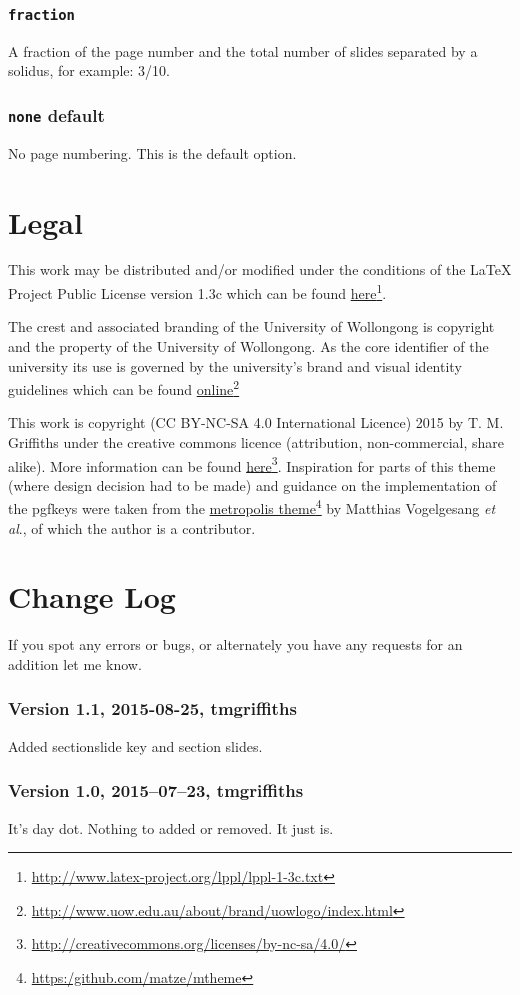 \documentclass[a4paper,oneside,11pt]{article}
\newcommand{\val}[1]{\texttt{\color{UOWblue}#1}}
\begin{document}
\subsubsection*{\val{fraction}}
A fraction of the page number and the total number of slides separated by a solidus, for example: 3/10.

\subsubsection*{\val{none} default}
No page numbering. This is the default option.


\section{Legal}
This work may be distributed and/or modified under the conditions of the LaTeX Project Public License version 1.3c which can be found \href{http://www.latex-project.org/lppl/lppl-1-3c.txt}{here}\footnote{\url{http://www.latex-project.org/lppl/lppl-1-3c.txt}}.

The crest and associated branding of the University of Wollongong is copyright and the property of the University of Wollongong. As the core identifier of the university its use is governed by the university's brand and visual identity guidelines which can be found \href{http://www.uow.edu.au/about/brand/uowlogo/index.html}{online}\footnote{\url{http://www.uow.edu.au/about/brand/uowlogo/index.html}}

This work is copyright (CC BY-NC-SA 4.0 International Licence) 2015 by T. M. Griffiths under the creative commons licence (attribution, non-commercial, share alike). More information can be found \href{http://creativecommons.org/licenses/by-nc-sa/4.0/}{here}\footnote{\url{http://creativecommons.org/licenses/by-nc-sa/4.0/}}. Inspiration for parts of this theme (where design decision had to be made) and guidance on the implementation of the pgfkeys were taken from the \href{https:/github.com/matze/mtheme}{metropolis theme}\footnote{\url{https:/github.com/matze/mtheme}} by Matthias Vogelgesang \textit{et al}., of which the author is a contributor. 

\vspace{1em}\begin{center}\ccbysa\end{center}


\section{Change Log}
If you spot any errors or bugs, or alternately you have any requests for an addition let me know.

\subsubsection*{Version 1.1, 2015-08-25, tmgriffiths}
Added sectionslide key and section slides.

\subsubsection*{Version 1.0, 2015–07–23, tmgriffiths}
It's day dot. Nothing to added or removed. It just is.
\end{document}
